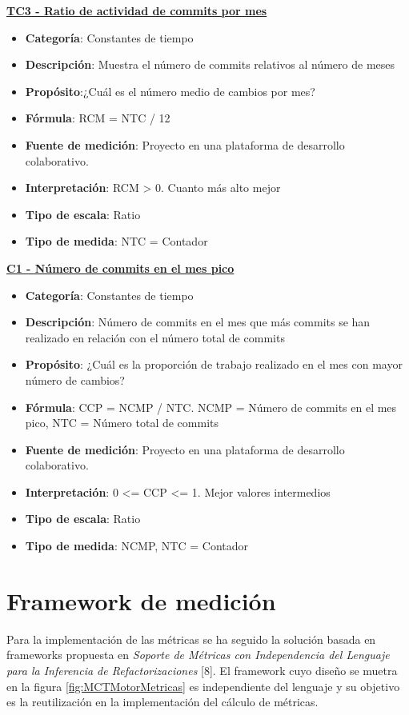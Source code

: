 \textbf{\underline{TC3 - Ratio de actividad de commits por mes}}
\begin{itemize}
	\tightlist
	\item \textbf{Categoría}: Constantes de tiempo
	\item \textbf{Descripción}: Muestra el número de commits relativos al número de meses
	\item \textbf{Propósito}:¿Cuál es el número medio de cambios por mes?
	\item \textbf{Fórmula}: RCM = NTC / 12
	\item \textbf{Fuente de medición}: Proyecto en una plataforma de desarrollo colaborativo.
	\item \textbf{Interpretación}: RCM > 0. Cuanto más alto mejor
	\item \textbf{Tipo de escala}: Ratio
	\item \textbf{Tipo de medida}: NTC = Contador
\end{itemize}
\textbf{\underline{C1 - Número de commits en el mes pico}}
\begin{itemize}
	\tightlist
	\item \textbf{Categoría}: Constantes de tiempo
	\item \textbf{Descripción}: Número de commits en el mes que más commits se han realizado en relación con el número total de commits
	\item \textbf{Propósito}: ¿Cuál es la proporción de trabajo realizado en el mes con mayor número de cambios?
	\item \textbf{Fórmula}: CCP = NCMP / NTC. NCMP = Número de commits en el mes pico, NTC = Número total de commits
	\item \textbf{Fuente de medición}: Proyecto en una plataforma de desarrollo colaborativo.
	\item \textbf{Interpretación}: 0 <= CCP <= 1. Mejor valores intermedios
	\item \textbf{Tipo de escala}: Ratio
	\item \textbf{Tipo de medida}: NCMP, NTC = Contador
\end{itemize}

\section{Framework de medición}
Para la implementación de las métricas se ha seguido la solución basada en frameworks propuesta en \textit{Soporte de Métricas con Independencia del Lenguaje para la Inferencia de Refactorizaciones} [8]. El framework cuyo diseño se muetra en la figura \ref{fig:MCTMotorMetricas} es independiente del lenguaje y su objetivo es la reutilización en la implementación del cálculo de métricas.
